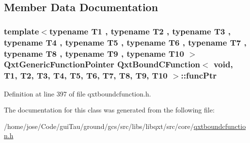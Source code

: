 \subsection{Member Data Documentation}
\hypertarget{class_qxt_bound_c_function_3_01void_00_01_t1_00_01_t2_00_01_t3_00_01_t4_00_01_t5_00_01_t6_00_01_e4575a50989f1ee70eb922dd1051fedb_a76acac791de5f64aff73dd6877a55316}{
\subsubsection[{func\-Ptr}]{\setlength{\rightskip}{0pt plus 5cm}template$<$typename T1 , typename T2 , typename T3 , typename T4 , typename T5 , typename T6 , typename T7 , typename T8 , typename T9 , typename T10 $>$ {\bf Qxt\-Generic\-Function\-Pointer} {\bf Qxt\-Bound\-C\-Function}$<$ {\bf void}, T1, T2, T3, T4, T5, T6, T7, T8, T9, T10 $>$\-::func\-Ptr}}\label{class_qxt_bound_c_function_3_01void_00_01_t1_00_01_t2_00_01_t3_00_01_t4_00_01_t5_00_01_t6_00_01_e4575a50989f1ee70eb922dd1051fedb_a76acac791de5f64aff73dd6877a55316}


Definition at line 397 of file qxtboundcfunction.\-h.



The documentation for this class was generated from the following file\-:\begin{DoxyCompactItemize}
\item 
/home/jose/\-Code/gui\-Tau/ground/gcs/src/libs/libqxt/src/core/\hyperlink{qxtboundcfunction_8h}{qxtboundcfunction.\-h}\end{DoxyCompactItemize}
